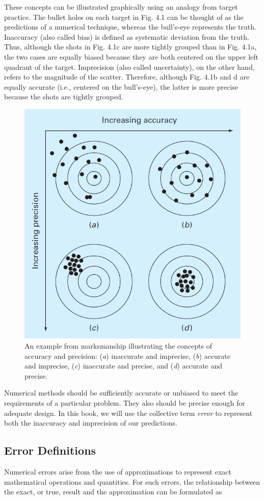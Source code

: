 \documentclass[../main.tex]{subfiles}
\begin{document}
These concepts can be illustrated graphically using an analogy from target practice.
The bullet holes on each target in Fig. 4.1 can be thought of as the predictions of a numerical
technique, whereas the bull's-eye represents the truth. Inaccuracy (also called bias) is
defined as systematic deviation from the truth. Thus, although the shots in Fig. 4.1c are
more tightly grouped than in Fig. 4.1a, the two cases are equally biased because they are
both centered on the upper left quadrant of the target. Imprecision (also called uncertainty),
on the other hand, refers to the magnitude of the scatter. Therefore, although Fig. 4.1b and
d are equally accurate (i.e., centered on the bull's-eye), the latter is more precise because
the shots are tightly grouped.

\begin{figure}[h]
    \includegraphics[width=0.55\linewidth]{./images/fig_4_1}    
    \caption{An example from marksmanship illustrating the concepts of accuracy and precision:
    (\emph{a}) inaccurate and imprecise, (\emph{b}) accurate and imprecise, (\emph{c}) inaccurate and precise,
    and (\emph{d}) accurate and precise.}
\end{figure}

\bigskip
Numerical methods should be sufficiently accurate or unbiased to meet the requirements
of a particular problem. They also should be precise enough for adequate design.
In this book, we will use the collective term \emph{error} to represent both the inaccuracy and
imprecision of our predictions.

\subsection{Error Definitions}
\noindent
Numerical errors arise from the use of approximations to represent exact mathematical operations
and quantities. For such errors, the relationship between the exact, or true, result
and the approximation can be formulated as
\newline
\end{document}
